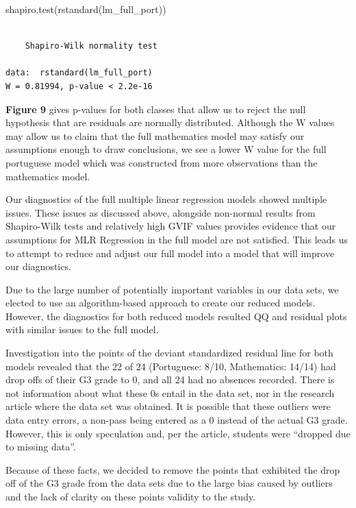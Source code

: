 \documentclass[
  letterpaper,
  DIV=11,
  numbers=noendperiod]{scrartcl}
\newenvironment{Shaded}{\begin{snugshade}}{\end{snugshade}}
\newcommand{\FunctionTok}[1]{\textcolor[rgb]{0.28,0.35,0.67}{#1}}
\newcommand{\NormalTok}[1]{\textcolor[rgb]{0.00,0.23,0.31}{#1}}
\begin{document}
\begin{Shaded}
\begin{Highlighting}[]
\FunctionTok{shapiro.test}\NormalTok{(}\FunctionTok{rstandard}\NormalTok{(lm\_full\_port))}
\end{Highlighting}
\end{Shaded}

\begin{verbatim}

    Shapiro-Wilk normality test

data:  rstandard(lm_full_port)
W = 0.81994, p-value < 2.2e-16
\end{verbatim}

\textbf{Figure 9} gives p-values for both classes that allow us to
reject the null hypothesis that are residuals are normally distributed.
Although the W values may allow us to claim that the full mathematics
model may satisfy our assumptions enough to draw conclusions, we see a
lower W value for the full portuguese model which was constructed from
more observations than the mathematics model.

Our diagnostics of the full multiple linear regression models showed
multiple issues. These issues as discussed above, alongside non-normal
results from Shapiro-Wilk tests and relatively high GVIF values provides
evidence that our assumptions for MLR Regression in the full model are
not satisfied. This leads us to attempt to reduce and adjust our full
model into a model that will improve our diagnostics.

Due to the large number of potentially important variables in our data
sets, we elected to use an algorithm-based approach to create our
reduced models. However, the diagnostics for both reduced models
resulted QQ and residual plots with similar issues to the full model.

Investigation into the points of the deviant standardized residual line
for both models revealed that the 22 of 24 (Portuguese: 8/10,
Mathematics: 14/14) had drop offs of their G3 grade to 0, and all 24 had
no absences recorded. There is not information about what these 0s
entail in the data set, nor in the research article where the data set
was obtained. It is possible that these outliers were data entry errors,
a non-pass being entered as a 0 instead of the actual G3 grade. However,
this is only speculation and, per the article, students were ``dropped
due to missing data''.

Because of these facts, we decided to remove the points that exhibited
the drop off of the G3 grade from the data sets due to the large bias
caused by outliers and the lack of clarity on these points validity to
the study.
\end{document}
